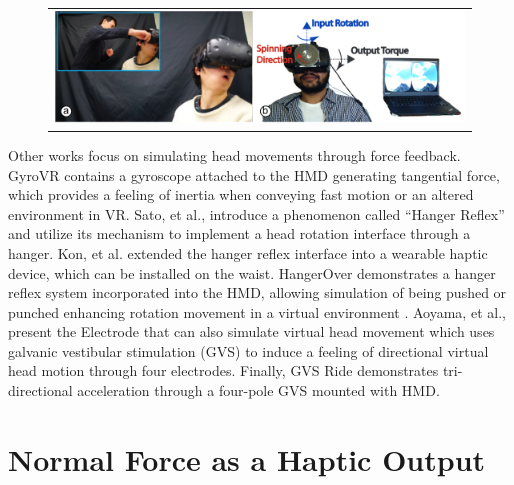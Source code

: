 \begin{figure}[h]
    \begin{center}
        \begin{tabular}{@{\hspace{0.1cm}}c}
           \includegraphics[width=1\textwidth]		{figures/HeadForce_RelatedWork.pdf}
        \end{tabular}
        \label{fig:HeadForce_RelatedWork}
    \end{center}
\end{figure}

Other works focus on simulating head movements through force feedback. GyroVR \cite{GyroVR} contains a gyroscope attached to the HMD generating tangential force, which provides a feeling of inertia when conveying fast motion or an altered environment in VR. Sato, et al., \cite{hangerreflex09} introduce a phenomenon called “Hanger Reflex” and utilize its mechanism to implement a head rotation interface through a hanger. Kon, et al. \cite{hangerreflex16} extended the hanger reflex interface into a wearable haptic device, which can be installed on the waist. HangerOver \cite{HangerOVER} demonstrates a hanger reflex system incorporated into the HMD, allowing simulation of being pushed or punched enhancing rotation movement in a virtual environment \cite{HangerOVER}. Aoyama, et al., \cite{GVS} present the Electrode that can also simulate virtual head movement which uses galvanic vestibular stimulation (GVS) to induce a feeling of directional virtual head motion through four electrodes. Finally, GVS Ride \cite{GVSRIDE} demonstrates tri-directional acceleration through a four-pole GVS mounted with HMD.

\section{Normal Force as a Haptic Output }


